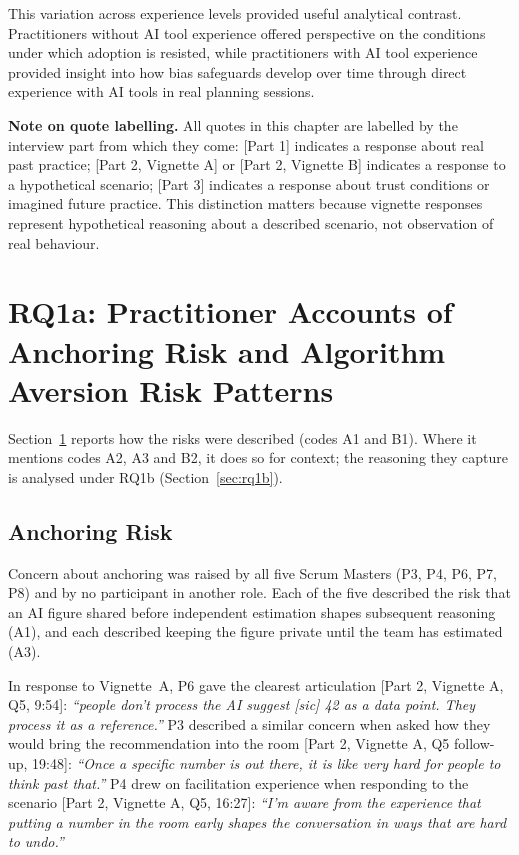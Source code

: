 \documentclass[a4paper,twoside]{bth}
\begin{document}
This variation across experience levels provided useful analytical contrast. Practitioners without AI tool experience offered perspective on the conditions under which adoption is resisted, while practitioners with AI tool experience provided insight into how bias safeguards develop over time through direct experience with AI tools in real planning sessions.

\textbf{Note on quote labelling.} All quotes in this chapter are labelled by the interview part from which they come: [Part 1] indicates a response about real past practice; [Part 2, Vignette A] or [Part 2, Vignette B] indicates a response to a hypothetical scenario; [Part 3] indicates a response about trust conditions or imagined future practice. This distinction matters because vignette responses represent hypothetical reasoning about a described scenario, not observation of real behaviour.

\section{RQ1a: Practitioner Accounts of Anchoring Risk and Algorithm Aversion Risk Patterns}
\label{sec:rq1a}

Section~\ref{sec:rq1a} reports how the risks were described (codes A1 and B1). Where it mentions codes A2, A3 and B2, it does so for context; the reasoning they capture is analysed under RQ1b (Section~\ref{sec:rq1b}).

\subsection{Anchoring Risk}

Concern about anchoring was raised by all five Scrum Masters (P3, P4, P6, P7, P8) and by no participant in another role. Each of the five described the risk that an AI figure shared before independent estimation shapes subsequent reasoning (A1), and each described keeping the figure private until the team has estimated (A3).

In response to Vignette~A, P6 gave the clearest articulation [Part 2, Vignette A, Q5, 9:54]: \textit{``people don't process the AI suggest [sic] 42 as a data point. They process it as a reference.''} P3 described a similar concern when asked how they would bring the recommendation into the room [Part 2, Vignette A, Q5 follow-up, 19:48]: \textit{``Once a specific number is out there, it is like very hard for people to think past that.''} P4 drew on facilitation experience when responding to the scenario [Part 2, Vignette A, Q5, 16:27]: \textit{``I'm aware from the experience that putting a number in the room early shapes the conversation in ways that are hard to undo.''}
\end{document}
